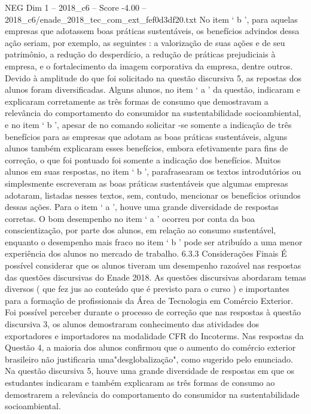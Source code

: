 \begin{textsample}{NEG Dim 1 – 2018\_c6 – Score -4.00 – 2018\_c6/enade\_2018\_tec\_com\_ext\_fef0d3df20.txt}
No item ‘ b ’, para aquelas empresas que adotassem boas práticas sustentáveis, os benefícios advindos dessa ação seriam, por exemplo, as seguintes : a valorização de suas ações e de seu patrimônio, a redução do desperdício, a redução de práticas prejudiciais à empresa, e o fortalecimento da imagem corporativa da empresa, dentre outros.
Devido à amplitude do que foi solicitado na questão discursiva 5, as repostas dos alunos foram diversificadas.
Alguns alunos, no item ‘ a ’ da questão, indicaram e explicaram corretamente as três formas de consumo que demostravam a relevância do comportamento do consumidor na sustentabilidade socioambiental, e no item ‘ b ’, apesar de no comando solicitar -se somente a indicação de três benefícios para as empresas que adotam as boas práticas sustentáveis, alguns alunos também explicaram esses benefícios, embora efetivamente para fins de correção, o que foi pontuado foi somente a indicação dos benefícios.
Muitos alunos em suas respostas, no item ‘ b ’, parafrasearam os textos introdutórios ou simplesmente escreveram as boas práticas sustentáveis que algumas empresas adotaram, listadas nesses textos, sem, contudo, mencionar os benefícios oriundos dessas ações.
Para o item ‘ a ’, houve uma grande diversidade de respostas corretas.
O bom desempenho no item ‘ a ’ ocorreu por conta da boa conscientização, por parte dos alunos, em relação ao consumo sustentável, enquanto o desempenho mais fraco no item ‘ b ’ pode ser atribuído a uma menor experiência dos alunos no mercado de trabalho. 6.3.3 Considerações Finais É possível considerar que os alunos tiveram um desempenho razoável nas respostas das questões discursivas do Enade 2018.
As questões discursivas abordaram temas diversos ( que fez jus ao conteúdo que é previsto para o curso ) e importantes para a formação de profissionais da Área de Tecnologia em Comércio Exterior.
Foi possível perceber durante o processo de correção que nas respostas à questão discursiva 3, os alunos demostraram conhecimento das atividades dos exportadores e importadores na modalidade CFR do Incoterms.
Nas respostas da Questão 4, a maioria dos alunos confirmou que o aumento do comércio exterior brasileiro não justificaria uma"desglobalização", como sugerido pelo enunciado.
Na questão discursiva 5, houve uma grande diversidade de respostas em que os estudantes indicaram e também explicaram as três formas de consumo ao demostrarem a relevância do comportamento do consumidor na sustentabilidade socioambiental.

\end{textsample}

